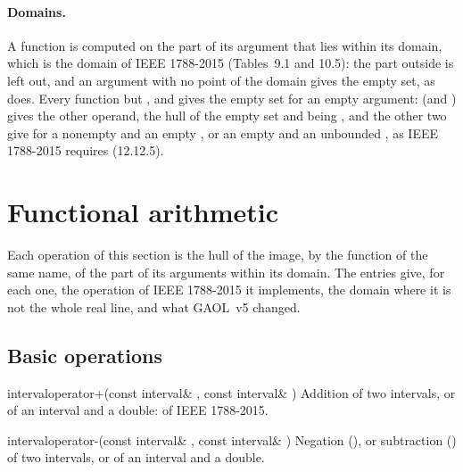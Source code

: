 \paragraph{Domains.}
A function is computed on the part of its argument that lies within its
domain, which is the domain of IEEE 1788-2015 (Tables~9.1 and 10.5): the
part outside is left out, and an argument with no point of the domain gives
the empty set, as  does.\newinvfive{} Every function
but ,  and  gives the empty set
for an empty argument:  (and ) gives the other operand,
the hull of the empty set and  being , and the other two
give \itv{-\infty}{+\infty} for a nonempty  and an empty , or an
empty  and an unbounded , as IEEE 1788-2015 requires
(12.12.5).
%

\section{Functional arithmetic}\label{sec:arithmetic-functional}

Each operation of this section is the hull of the image, by the function of
the same name, of the part of its arguments within its domain. The entries
give, for each one, the operation of IEEE 1788-2015 it implements, the
domain where it is not the whole real line, and what GAOL~v5 changed.

\subsection{Basic operations}\label{sec:arithmetic-basic}

\begin{deffun}{interval}{operator+}{(const interval\& , const interval\& )}
  Addition of two intervals, or of an interval and a double:  of
  IEEE 1788-2015.
\end{deffun}

\begin{deffun}{interval}{operator-}{(const interval\& , const interval\& )}
  Negation (), or subtraction () of two intervals, or of
  an interval and a double.
\end{deffun}

